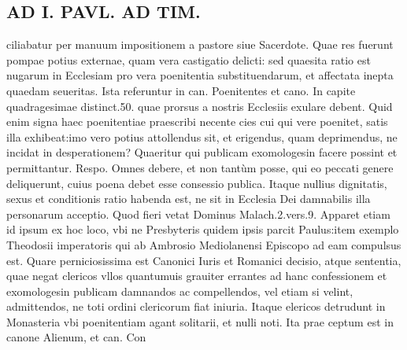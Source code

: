 \documentclass{article}
\begin{document}
\begin{pages}
\section*{AD I. PAVL. AD TIM. }
\marginpar{[ p.324 ]}\pstart ciliabatur per manuum impositionem a pastore siue Sacerdote. Quae res fuerunt pompae potius externae, quam vera castigatio delicti: sed quaesita ratio est nugarum in Ecclesiam pro vera poenitentia substituendarum, et affectata inepta quaedam seueritas. Ista referuntur in can. Poenitentes et cano. In capite quadragesimae distinct.50. quae prorsus a nostris Ecclesiis exulare debent. Quid enim signa haec poenitentiae praescribi necente cies cui qui vere poenitet, satis illa exhibeat:imo vero potius attollendus sit, et erigendus, quam deprimendus, ne incidat in desperationem?  \pend\pstart Quaeritur qui publicam exomologesin facere possint et permittantur. Respo. Omnes debere, et non tantùm posse, qui eo peccati genere deliquerunt, cuius poena debet esse consessio publica. Itaque nullius dignitatis, sexus et conditionis ratio habenda est, ne sit in Ecclesia Dei damnabilis illa personarum acceptio. Quod fieri vetat Dominus Malach.2.vers.9. Apparet etiam id ipsum ex hoc loco, vbi ne Presbyteris quidem ipsis parcit Paulus:item exemplo Theodosii imperatoris qui ab Ambrosio Mediolanensi Episcopo ad eam compulsus est. Quare perniciosissima est Canonici Iuris et Romanici decisio, atque sententia, quae negat clericos vllos quantumuis grauiter errantes ad hanc confessionem et exomologesin publicam damnandos ac compellendos, vel etiam si velint, admittendos, ne toti ordini clericorum fiat iniuria. Itaque  elericos detrudunt in Monasteria vbi poenitentiam agant solitarii, et nulli noti. Ita prae ceptum est in canone Alienum, et can. Con\pend

\end{pages}
\end{document}
